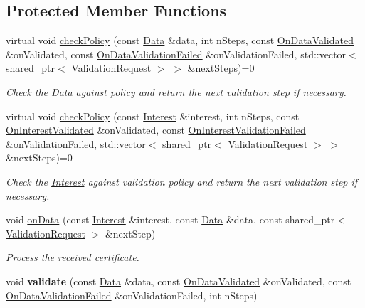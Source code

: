 \subsection*{Protected Member Functions}
\begin{DoxyCompactItemize}
\item 
virtual void \hyperlink{classndn_1_1Validator_a341b1faa8a15ae17c5157d5387a75ef5}{check\+Policy} (const \hyperlink{classndn_1_1Data}{Data} \&data, int n\+Steps, const \hyperlink{namespacendn_aeaa15e849fd25636f59ca61acb64e532}{On\+Data\+Validated} \&on\+Validated, const \hyperlink{namespacendn_ae3c60219d74ba747e368708d93782760}{On\+Data\+Validation\+Failed} \&on\+Validation\+Failed, std\+::vector$<$ shared\+\_\+ptr$<$ \hyperlink{classndn_1_1ValidationRequest}{Validation\+Request} $>$ $>$ \&next\+Steps)=0
\begin{DoxyCompactList}\small\item\em Check the \hyperlink{classndn_1_1Data}{Data} against policy and return the next validation step if necessary. \end{DoxyCompactList}\item 
virtual void \hyperlink{classndn_1_1Validator_a8ad5a76c67c489afcb493f722f142e34}{check\+Policy} (const \hyperlink{classndn_1_1Interest}{Interest} \&interest, int n\+Steps, const \hyperlink{namespacendn_a90fe4b4d97a7870d87f2fce8fdc88f95}{On\+Interest\+Validated} \&on\+Validated, const \hyperlink{namespacendn_a6cb4f04de7c1e8da06d8f5865b3d2877}{On\+Interest\+Validation\+Failed} \&on\+Validation\+Failed, std\+::vector$<$ shared\+\_\+ptr$<$ \hyperlink{classndn_1_1ValidationRequest}{Validation\+Request} $>$ $>$ \&next\+Steps)=0
\begin{DoxyCompactList}\small\item\em Check the \hyperlink{classndn_1_1Interest}{Interest} against validation policy and return the next validation step if necessary. \end{DoxyCompactList}\item 
void \hyperlink{classndn_1_1Validator_ab3e41481cbf23614dd0862dfd3abbd36}{on\+Data} (const \hyperlink{classndn_1_1Interest}{Interest} \&interest, const \hyperlink{classndn_1_1Data}{Data} \&data, const shared\+\_\+ptr$<$ \hyperlink{classndn_1_1ValidationRequest}{Validation\+Request} $>$ \&next\+Step)\hypertarget{classndn_1_1Validator_ab3e41481cbf23614dd0862dfd3abbd36}{}\label{classndn_1_1Validator_ab3e41481cbf23614dd0862dfd3abbd36}

\begin{DoxyCompactList}\small\item\em Process the received certificate. \end{DoxyCompactList}\item 
void {\bfseries validate} (const \hyperlink{classndn_1_1Data}{Data} \&data, const \hyperlink{namespacendn_aeaa15e849fd25636f59ca61acb64e532}{On\+Data\+Validated} \&on\+Validated, const \hyperlink{namespacendn_ae3c60219d74ba747e368708d93782760}{On\+Data\+Validation\+Failed} \&on\+Validation\+Failed, int n\+Steps)\hypertarget{classndn_1_1Validator_aa5d39cf35ec7906b8485f5ffdd60b560}{}\label{classndn_1_1Validator_aa5d39cf35ec7906b8485f5ffdd60b560}


\end{DoxyCompactItemize}
